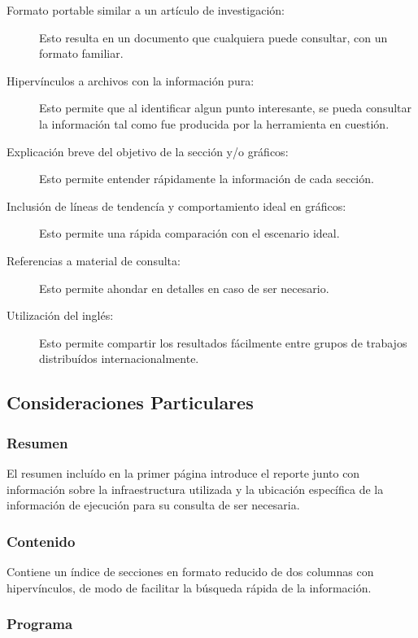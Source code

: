 \documentclass[a4paper]{report}
\begin{document}
\begin{description}
\item[Formato portable similar a un artículo de investigación:] Esto resulta en un documento que cualquiera puede consultar, con un formato familiar.
\item[Hipervínculos a archivos con la información pura:] Esto permite que al identificar algun punto interesante, se pueda consultar la información tal como fue producida por la herramienta en cuestión.
\item[Explicación breve del objetivo de la sección y/o gráficos:] Esto permite entender rápidamente la información de cada sección.
\item[Inclusión de líneas de tendencía y comportamiento ideal en gráficos:] Esto permite una rápida comparación con el escenario ideal.
\item[Referencias a material de consulta:] Esto permite ahondar en detalles en caso de ser necesario.
\item[Utilización del inglés:] Esto permite compartir los resultados fácilmente entre grupos de trabajos distribuídos internacionalmente.
\end{description}

\subsection{Consideraciones Particulares}

\subsubsection{Resumen}

El resumen incluído en la primer página introduce el reporte junto con información sobre la infraestructura utilizada y la ubicación específica de la información de ejecución para su consulta
de ser necesaria.

\subsubsection{Contenido}

Contiene un índice de secciones en formato reducido de dos columnas con hipervínculos, de modo de facilitar la búsqueda rápida de la información.

\subsubsection{Programa}
\end{document}
